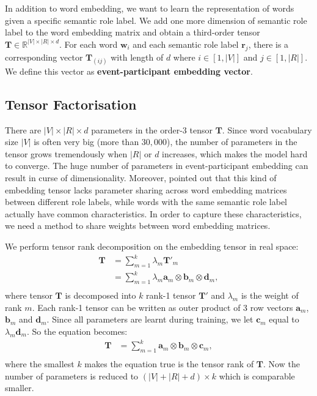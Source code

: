 \documentclass[a4paper]{article}
\begin{document}
In addition to word embedding, we want to learn the representation of words given a specific semantic role label. We add one more dimension of semantic role label to the word embedding matrix and obtain a third-order tensor $\mathbf{T} \in \mathbb{R}^{|V| \times |R| \times d}$. For each word $\mathbf{w}_i$ and each semantic role label $\mathbf{r}_j$, there is a corresponding vector $\mathbf{T}_{(ij)}$ with length of $d$ where $i \in [1, |V|]$ and $j \in [1, |R|]$. We define this vector as \textbf{event-participant embedding vector}. 


\subsection{Tensor Factorisation} \label{sec:tf}
There are $|V| \times |R| \times d$ parameters in the order-3 tensor $\mathbf{T}$. Since word vocabulary size $|V|$ is often very big (more than $30,000$), the number of parameters in the tensor grows tremendously when $|R|$ or $d$ increases, which makes the model hard to converge. The huge number of parameters in event-participant embedding can result in curse of dimensionality. Moreover, \citep{tilk2016event} pointed out that this kind of embedding tensor lacks parameter sharing across word embedding matrices between different role labels, while words with the same semantic role label actually have common characteristics. In order to capture these characteristics, we need a method to share weights between word embedding matrices. 

We perform tensor rank decomposition \citep{hitchcock1927expression} on the embedding tensor in real space:
\begin{equation} \label{eq:trd-org}
\begin{aligned}
    \mathbf{T}   
        &= \sum_{m=1}^{k} \lambda_m \mathbf{T}'_m \\
        &= \sum_{m=1}^{k} \lambda_m \mathbf{a}_m \otimes \mathbf{b}_m \otimes \mathbf{d}_m, \\
\end{aligned}
\end{equation}
where tensor $\mathbf{T}$ is decomposed into $k$ rank-1 tensor $\mathbf{T}'$ and $\lambda_m$ is the weight of rank $m$. Each rank-1 tensor can be written as outer product of 3 row vectors $\mathbf{a}_m$, $\mathbf{b}_m$ and $\mathbf{d}_m$. Since all parameters are learnt during training, we let $\mathbf{c}_m$ equal to $\lambda_m \mathbf{d}_m$. So the equation becomes:
\begin{equation} \label{eq:trd}
\begin{aligned}
    \mathbf{T}   
        &= \sum_{m=1}^{k} \mathbf{a}_m \otimes \mathbf{b}_m \otimes \mathbf{c}_m, \\
\end{aligned}
\end{equation}
where the smallest $k$ makes the equation true is the tensor rank of $\mathbf{T}$. Now the number of parameters is reduced to $(|V| + |R| + d) \times k$ which is comparable smaller. 
\end{document}
